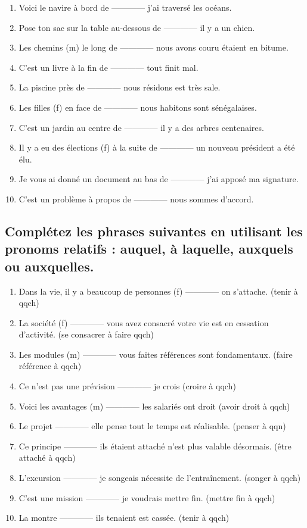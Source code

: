 \documentclass[12pt]{article}
\begin{document}
\begin{enumerate}
 \item Voici le navire à bord de ------------ j’ai traversé les océans. \item Pose ton sac sur la table au-dessous de ------------ il y a un chien. \item Les chemins (m) le long de ------------ nous avons couru étaient en bitume. \item C’est un livre à la fin de ------------ tout finit mal. \item La piscine près de ------------ nous résidons est très sale. \item Les filles (f) en face de ------------ nous habitons sont sénégalaises. \item C’est un jardin au centre de ------------ il y a des arbres centenaires.
 \item Il y a eu des élections (f) à la suite de ------------ un nouveau président a été élu. \item Je vous ai donné un document au bas de ------------ j’ai apposé ma signature. \item C’est un problème à propos de ------------ nous sommes d’accord.
\end{enumerate}

\subsection{Complétez les phrases suivantes en utilisant les pronoms relatifs : auquel, à laquelle, auxquels ou auxquelles.} 
\begin{enumerate}
\item Dans la vie, il y a beaucoup de personnes (f) ------------ on s’attache. (tenir à qqch) \item La société (f) ------------ vous avez consacré votre vie est en cessation d’activité. (se consacrer à faire qqch) \item Les modules (m) ------------ vous faites références sont fondamentaux. (faire référence à qqch) \item Ce n’est pas une prévision ------------ je crois (croire à qqch) \item Voici les avantages (m) ------------ les salariés ont droit (avoir droit à qqch) \item Le projet ------------ elle pense tout le temps est réalisable. (penser à qqn) \item Ce principe ------------ ils étaient attaché n’est plus valable désormais. (être attaché à qqch) \item L’excursion ------------ je songeais nécessite de l’entraînement. (songer à qqch) \item C’est une mission ------------ je voudrais mettre fin. (mettre fin à qqch) \item La montre ------------ ils tenaient est cassée. (tenir à qqch)
\end{enumerate}
\end{document}
